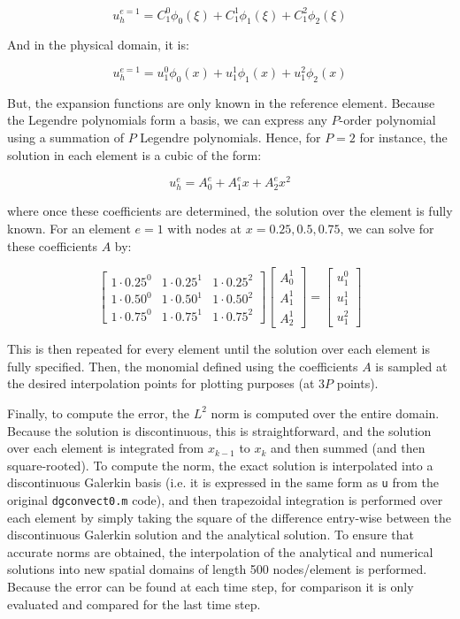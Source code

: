 \documentclass[10pt]{article}
\newcommand{\beq}{\begin{equation}}
\newcommand{\eeq}{\end{equation}}
\begin{document}
\beq
u_h^{e=1}=C_1^0\phi_0(\xi)+C_1^1\phi_1(\xi)+C_1^2\phi_2(\xi)
\eeq

And in the physical domain, it is:

\beq
u_h^{e=1}=u_1^0\phi_0(x)+u_1^1\phi_1(x)+u_1^2\phi_2(x)
\eeq

But, the expansion functions are only known in the reference element. Because the Legendre polynomials form a basis, we can express any \(P\)-order polynomial using a summation of \(P\) Legendre polynomials. Hence, for \(P=2\) for instance, the solution in each element is a cubic of the form:

\beq
u_h^e=A_0^e+A_1^ex+A_2^ex^2
\eeq

where once these coefficients are determined, the solution over the element is fully known. For an element \(e=1\) with nodes at \(x=0.25, 0.5, 0.75\), we can solve for these coefficients \(A\) by:

\beq
\begin{bmatrix}
1\cdot 0.25^0 & 1\cdot 0.25^1 & 1\cdot 0.25^2\\
1\cdot 0.50^0 & 1\cdot 0.50^1 & 1\cdot 0.50^2\\
1\cdot 0.75^0 & 1\cdot 0.75^1 & 1\cdot 0.75^2
\end{bmatrix}
\begin{bmatrix}
A_0^1\\
A_1^1\\
A_2^1
\end{bmatrix}
=
\begin{bmatrix}
u_1^0\\
u_1^1\\
u_1^2
\end{bmatrix}
\eeq

This is then repeated for every element until the solution over each element is fully specified. Then, the monomial defined using the coefficients \(A\) is sampled at the desired interpolation points for plotting purposes (at \(3P\) points). 

Finally, to compute the error, the \(L^2\) norm is computed over the entire domain. Because the solution is discontinuous, this is straightforward, and the solution over each element is integrated from \(x_{k-1}\) to \(x_k\) and then summed (and then square-rooted). To compute the norm, the exact solution is interpolated into a discontinuous Galerkin basis (i.e. it is expressed in the same form as {\tt u} from the original {\tt dgconvect0.m} code), and then trapezoidal integration is performed over each element by simply taking the square of the difference entry-wise between the discontinuous Galerkin solution and the analytical solution. To ensure that accurate norms are obtained, the interpolation of the analytical and numerical solutions into new spatial domains of length 500 nodes/element is performed. Because the error can be found at each time step, for comparison it is only evaluated and compared for the last time step.
\end{document}
